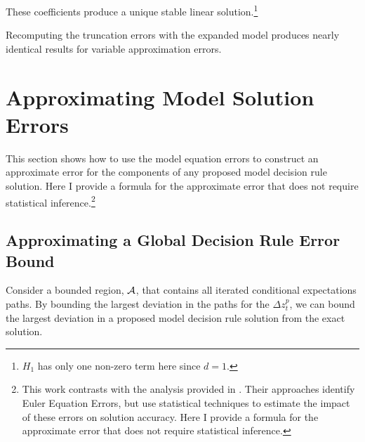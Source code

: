 \documentclass[12pt]{article}
\begin{document}
These coefficients  produce a unique stable linear solution.\footnote{$H_{1}$  has only one non-zero term here since $d=1$.}

Recomputing the truncation errors with the expanded model produces nearly identical results for  variable approximation errors.


\clearpage
\section{Approximating Model Solution Errors}
\label{sec:solnerrorbounds}


This section shows how to use the model equation errors  to construct an 
approximate error for the components of any proposed
model decision rule solution.   Here I provide
a formula for the approximate error that does not require statistical inference.\footnote{This work contrasts with the analysis provided in
 \citep{judd2017lower,peralta-alva14,santos2005accuracy,Santos2000accuracy}. 
Their approaches identify Euler Equation Errors, but use statistical techniques to estimate the impact of these errors on solution accuracy.  Here I provide
a formula for the approximate error that does not require statistical inference.}



\subsection{Approximating a Global Decision Rule Error Bound}
\label{sec:an-error-bound}



\label{sec:errorformula}

Consider a bounded region, $\mathcal{A}$, that contains all iterated conditional expectations paths.
  By bounding the largest deviation in the paths for the $\Delta z_t^p$, we can bound the largest deviation in a proposed model decision rule solution from the exact solution. 
\end{document}
